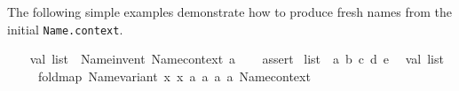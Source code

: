 \begin{isabellebody}
\begin{isamarkuptext}
\begin{description}
  \end{description}%
\end{isamarkuptext}%
\isamarkuptrue%
%
\endisatagmlref
{\isafoldmlref}%
%
\isadelimmlref
%
\endisadelimmlref
%
\isadelimmlex
%
\endisadelimmlex
%
\isatagmlex
%
\begin{isamarkuptext}%
The following simple examples demonstrate how to produce
  fresh names from the initial \verb|Name.context|.%
\end{isamarkuptext}%
\isamarkuptrue%
%
\endisatagmlex
{\isafoldmlex}%
%
\isadelimmlex
%
\endisadelimmlex
%
\isadelimML
%
\endisadelimML
%
\isatagML
{}\isamarkupfalse%
\ {}\isanewline
\ \ val\ list{}\ {}\ Name{}invent\ Name{}context\ {}a{}\ {}{}\isanewline
\ \ %
\isaantiq
assert{}%
\endisaantiq
\ {}list{}\ {}\ {}{}a{}{}\ {}b{}{}\ {}c{}{}\ {}d{}{}\ {}e{}{}{}{}\isanewline
\isanewline
\ \ val\ list{}\ {}\isanewline
\ \ \ \ {}{}\ {}fold{}map\ Name{}variant\ {}{}x{}{}\ {}x{}{}\ {}a{}{}\ {}a{}{}\ {}{}a{}{}\ {}{}a{}{}\ Name{}context{}{}\isanewline

\end{isabellebody}
